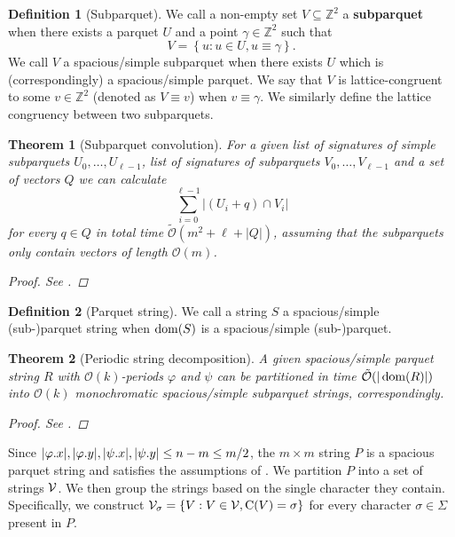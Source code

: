 \documentclass[11pt]{article}
\newcommand{\Z}{\mathbb{Z}}
\renewcommand{\O}{\mathcal{O}}
\newcommand{\tO}{\tilde{\mathcal{O}}}
\renewcommand{\phi}{\varphi}
\newcommand{\set}[1]{\left\lbrace #1 \right\rbrace}
\theoremstyle{plain}
\newtheorem{theorem}{Theorem}
\theoremstyle{definition}
\newtheorem{definition}{Definition}
\theoremstyle{remark}
\begin{document}
\begin{definition}[Subparquet]\label{subparquet_definition}
	We call a non-empty set $V \subseteq \Z^2$ a \textbf{subparquet} when there exists a parquet $U$ and a point $\gamma \in \Z^2$ such that
	$$ V = \set{u : u \in U, u \equiv \gamma}.$$
	We call $V$ a spacious/simple subparquet when there exists $U$ which is (correspondingly) a spacious/simple parquet.
	We say that $V$ is lattice-congruent to some $v \in \Z^2$ (denoted as $V \equiv v$) when $v \equiv \gamma$.
	We similarly define the lattice congruency between two subparquets.
\end{definition}


\begin{theorem}[Subparquet convolution]\label{subparquet_convolution}
	For a given list of signatures of simple subparquets $U_0, \dots, U_{\ell - 1}$, list of signatures of subparquets $V_0, \dots, V_{\ell - 1}$ and a set of vectors $Q$ we can calculate
	$$ \sum_{i = 0}^{\ell - 1} |(U_i + q) \cap V_i| $$
	for every $q \in Q$ in total time $\tO(m^2 + \ell + |Q|)$, assuming that the subparquets only contain vectors of length $\O(m)$.
	\begin{proof} See . \end{proof}
\end{theorem}


\begin{definition}[Parquet string]
	We call a string $S$ a spacious/simple (sub-)parquet string when $\operatorname*{dom}(S)$ is a spacious/simple (sub-)parquet.
\end{definition}


\begin{theorem}[Periodic string decomposition]\label{parquet_decomposition}
	A given spacious/simple parquet string $R$ with $\O(k)$-periods $\phi$ and $\psi$ can be partitioned in time $\tO(|\d{R}|)$ into $\O(k)$ monochromatic spacious/simple subparquet strings, correspondingly.
	\begin{proof} See . \end{proof}
\end{theorem}


Since $|\x{\phi}|, |\y{\phi}|, |\x{\psi}|, |\y{\psi}| \le n - m \le m / 2$, the $m \times m$ string $P$ is a spacious parquet string and satisfies the assumptions of .
We partition $P$ into a set of strings $\mathcal{V}$.
We then group the strings based on the single character they contain.
Specifically, we construct $\V_\sigma = \set{V : V \in \V, \getchar{V} = \sigma}$ for every character $\sigma \in \Sigma$ present in $P$.
\end{document}
